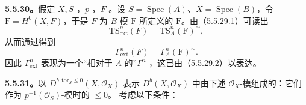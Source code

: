 \textbf{5.5.30。}假定 $X,S$ ，$p$ ，$F$ 。设 $S=\operatorname{Spec}(A)$、$X=\operatorname{Spec}(B)$，令 $\mathrm F=H^0(X,F)$，于是 $F$ 为 $B$-模 $\mathrm F$ 所定义的 $\widetilde{\mathrm F}$。由（5.5.29.1）可读出
\[\mathrm{TS}^n_{\mathrm{ext}}(F)=\mathrm{TS}^n_A(\mathrm F)^{\sim},\]
从而通过得到
\begin{equation}\tag{5.5.30.1}\Gamma^n_{\mathrm{ext}}(F)=\Gamma^n_A(\mathrm F)^{\sim}.\end{equation}
因此 $\Gamma^n_{\mathrm{ext}}$ 表现为一个“相对于 $A$ 的”$\Gamma^n$ ，这已由（5.5.29.2）以表达。

\textbf{5.5.31。}以 $D^{b,\mathrm{tor}_S\leq0}(X,\mathscr O_X)$ 表示 $D^b(X,\mathscr O_X)$ 中由下述 $\mathscr O_X$-模组成的：它们作为 $p^{-1}(\mathscr O_S)$-模时的  $\leq0$。
考虑以下条件：

